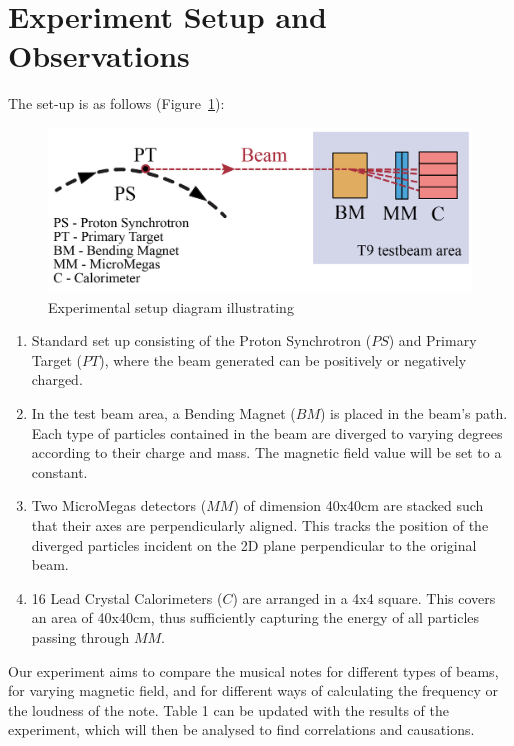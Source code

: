 \section{\textbf{Experiment Setup and Observations}}

The set-up is as follows (Figure~\ref{fig:setup}):

\begin{figure}
\includegraphics[width=\textwidth]{Sections/Diagrams/diagram.png}
\centering
\caption{Experimental setup diagram illustrating }
\label{fig:setup}
\end{figure}

\begin{enumerate}
    \item Standard set up consisting of the Proton Synchrotron ($PS$) and Primary Target ($PT$), where the beam generated can be positively or negatively charged.
    \item In the test beam area, a Bending Magnet ($BM$) is placed in the beam's path. Each type of particles contained in the beam are diverged to varying degrees according to their charge and mass. The magnetic field value will be set to a constant.
    \item Two MicroMegas detectors ($MM$) of dimension 40x40cm are stacked such that their axes are perpendicularly aligned. This tracks the position of the diverged particles incident on the 2D plane perpendicular to the original beam. 
    \item 16 Lead Crystal Calorimeters ($C$) are arranged in a 4x4 square. This covers an area of 40x40cm, thus sufficiently capturing the energy of all particles passing through $MM$.
\end{enumerate}


Our experiment aims to compare the musical notes for different types of beams, for varying magnetic field, and for different ways of calculating the frequency or the loudness of the note. Table 1 can be updated with the results of the experiment, which will then be analysed to find correlations and causations.

